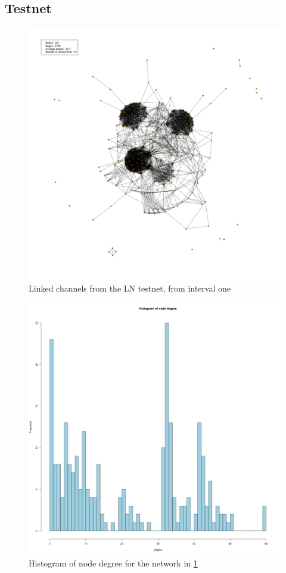 \subsection{Testnet}

\begin{figure}[ht]
    \centering
    \includegraphics[width=14cm]{figures/graphs/cg_ln_testnet_run1.png}
    \caption{Linked channels from the LN testnet, from interval one}
    \label{fig:channel_network_LN_testnet}
\end{figure}

\begin{figure}[H]
    \centering
    \includegraphics[width=16cm]{figures/graphs/histogram_ln_testnet_run1.png}
    \caption{Histogram of node degree for the network in \cref{fig:channel_network_LN_testnet}}
    \label{fig:histogram}
\end{figure}

